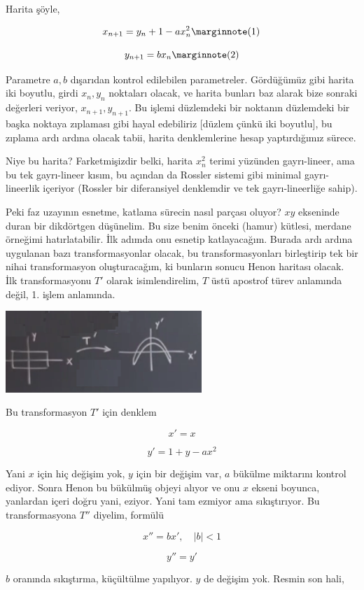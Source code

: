 \documentclass[12pt,fleqn]{article}\usepackage{../../common}
\begin{document}
Harita şöyle,

$$ 
x_{n+1} = y_n + 1 - a x_n^2  
\mlabel{1}
$$

$$ 
y_{n+1} = b x_n 
\mlabel{2} 
$$

Parametre $a,b$ dışarıdan kontrol edilebilen parametreler. Gördüğümüz gibi
harita iki boyutlu, girdi $x_n,y_n$ noktaları olacak, ve harita bunları baz
alarak bize sonraki değerleri veriyor, $x_{n+1},y_{n+1}$.  Bu işlemi
düzlemdeki bir noktanın düzlemdeki bir başka noktaya zıplaması gibi hayal
edebiliriz [düzlem çünkü iki boyutlu], bu zıplama ardı ardına olacak tabii,
harita denklemlerine hesap yaptırdığımız sürece.

Niye bu harita? Farketmişizdir belki, harita $x_n^2$ terimi yüzünden
gayrı-lineer, ama bu tek gayrı-lineer kısım, bu açından da Rossler sistemi
gibi minimal gayrı-lineerlik içeriyor (Rossler bir diferansiyel denklemdir
ve tek gayrı-lineerliğe sahip).

Peki faz uzayının esnetme, katlama sürecin nasıl parçası oluyor? $xy$
ekseninde duran bir dikdörtgen düşünelim. Bu size benim önceki (hamur)
kütlesi, merdane örneğimi hatırlatabilir. İlk adımda onu esnetip
katlayacağım. Burada ardı ardına uygulanan bazı transformasyonlar olacak,
bu transformasyonları birleştirip tek bir nihai transformasyon
oluşturacağım, ki bunların sonucu Henon haritası olacak. İlk
transformasyonu $T'$ olarak isimlendirelim, $T$ üstü apostrof türev
anlamında değil, 1. işlem anlamında.

\includegraphics[width=20em]{24_02.png}

Bu transformasyon $T'$ için denklem

$$ x' = x$$

$$ y' = 1 + y - ax^2$$

Yani $x$ için hiç değişim yok, $y$ için bir değişim var, $a$ bükülme
miktarını kontrol ediyor.  Sonra Henon bu bükülmüş objeyi alıyor ve onu $x$
ekseni boyunca, yanlardan içeri doğru yani, eziyor. Yani tam ezmiyor ama
sıkıştırıyor. Bu transformasyona $T''$ diyelim, formülü

$$ x'' = b x', \quad |b| < 1$$

$$ y'' = y' $$

$b$ oranında sıkıştırma, küçültülme yapılıyor. $y$ de değişim yok. Resmin
son hali,
\end{document}
